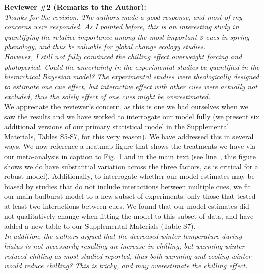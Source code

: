 \documentclass{article}
\newcommand{\lr}[1]{line~\lineref{#1}}
\begin{document}
{\bf Reviewer \#2 (Remarks to the Author):}\\

\emph{Thanks for the revision. The authors made a good response, and most of my concerns were responded. As I pointed before, this is an interesting study in quantifying the relative importance among the most important 3 cues in spring phenology, and thus be valuable for global change ecology studies. }\\


\emph{However, I still not fully convinced the chilling effect overweight forcing and photoperiod. Could the uncertainty in the experimental studies be quantified in the hierarchical Bayesian model? The experimental studies were theologically designed to estimate one cue effect, but interactive effect with other cues were actually not excluded, thus the solely effect of one cues might be overestimated.}\\ 

We appreciate the reviewer's concern, as this is one we had ourselves when we saw the results and we have worked to interrogate our model fully (we present six additional versions of our primary statistical model in the Supplemental Materials, Tables S5-S7, for this very reason). We have addressed this in several ways. We now reference a heatmap figure that shows the treatments we have via our meta-analysis in  caption to Fig. 1 and in the main text (see \lr{heatmap}, this figure shows we do have substantial variation across the three factors, as is critical for a robust model). Additionally, to interrogate whether our model estimates may be biased by studies that do not include interactions between multiple cues, we fit our main budburst model to a new subset of experiments: only those that tested at least two interactions between cues. We found that our model estimates did not qualitatively change when fitting the model to this subset of data, and have added a new table to our Supplemental Materials (Table S7).\\

\emph{In addition, the authors argued that the decreased winter temperature during hiatus is not necessarily resulting an increase in chilling, but warming winter reduced chilling as most studied reported, thus both warming and cooling winter would reduce chilling? This is tricky, and may overestimate the chilling effect.}\\
\end{document}
